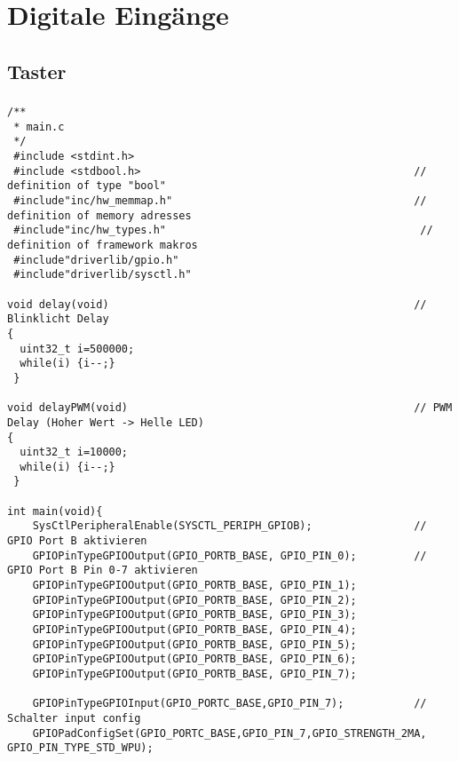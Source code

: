\section{Digitale Eingänge}
\subsection{Taster}
\subsubsection{}
\begin{lstlisting}
/**
 * main.c
 */
 #include <stdint.h>
 #include <stdbool.h>                                           // definition of type "bool"
 #include"inc/hw_memmap.h"                                      // definition of memory adresses
 #include"inc/hw_types.h"                                        // definition of framework makros
 #include"driverlib/gpio.h"
 #include"driverlib/sysctl.h"

void delay(void)                                                // Blinklicht Delay
{
  uint32_t i=500000;
  while(i) {i--;}
 }

void delayPWM(void)                                             // PWM Delay (Hoher Wert -> Helle LED)
{
  uint32_t i=10000;
  while(i) {i--;}
 }

int main(void){
    SysCtlPeripheralEnable(SYSCTL_PERIPH_GPIOB);                // GPIO Port B aktivieren
    GPIOPinTypeGPIOOutput(GPIO_PORTB_BASE, GPIO_PIN_0);         // GPIO Port B Pin 0-7 aktivieren
    GPIOPinTypeGPIOOutput(GPIO_PORTB_BASE, GPIO_PIN_1);
    GPIOPinTypeGPIOOutput(GPIO_PORTB_BASE, GPIO_PIN_2);
    GPIOPinTypeGPIOOutput(GPIO_PORTB_BASE, GPIO_PIN_3);
    GPIOPinTypeGPIOOutput(GPIO_PORTB_BASE, GPIO_PIN_4);
    GPIOPinTypeGPIOOutput(GPIO_PORTB_BASE, GPIO_PIN_5);
    GPIOPinTypeGPIOOutput(GPIO_PORTB_BASE, GPIO_PIN_6);
    GPIOPinTypeGPIOOutput(GPIO_PORTB_BASE, GPIO_PIN_7);

    GPIOPinTypeGPIOInput(GPIO_PORTC_BASE,GPIO_PIN_7);           // Schalter input config
    GPIOPadConfigSet(GPIO_PORTC_BASE,GPIO_PIN_7,GPIO_STRENGTH_2MA, GPIO_PIN_TYPE_STD_WPU);


\end{lstlisting}
